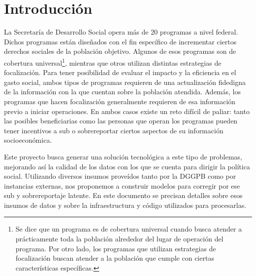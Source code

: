 \chapter{Introducción}
La Secretaría de Desarrollo Social opera más de 20 programas a nivel federal. Dichos programas están diseñados con el fin específico de incrementar ciertos derechos sociales de la población objetivo. Algunos de esos programas son de cobertura universal\footnote{Se dice que un programa es de cobertura universal cuando busca atender a prácticamente toda la población alrededor del lugar de operación del programa. Por otro lado, los programas que utilizan estrategias de focalización buscan atender a la población que cumple con ciertas características específicas.}, mientras que otros utilizan distintas estrategias de focalización. Para tener posibilidad de evaluar el impacto y la eficiencia en el gasto social, ambos tipos de programas requieren de una actualización fidedigna de la información con la que cuentan sobre la población atendida. Además, los programas que hacen focalización generalmente requieren de esa información previo a iniciar operaciones. En ambos casos existe un reto difícil de paliar: tanto las posibles beneficiarias como las personas que operan los programas pueden tener incentivos a sub o sobrereportar ciertos aspectos de su información socioeconómica.
\par
\noindent
Este proyecto busca generar una solución tecnológica a este tipo de problemas, mejorando así la calidad de los datos con los que se cuenta para dirigir la política social. Utilizando diversos insumos proveídos tanto por la DGGPB como por instancias externas, nos proponemos a construir modelos para corregir por ese sub y sobrereportaje latente. En este documento se precisan detalles sobre esos insumos de datos y sobre la infraestructura y código utilizados para procesarlas.
